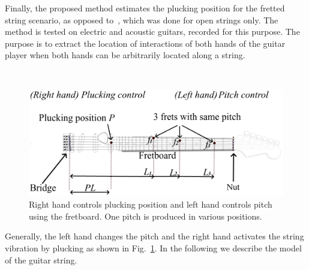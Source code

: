 \documentclass{article}
\begin{document}
Finally, the proposed method estimates the plucking position for the fretted string scenario, as opposed to~\cite{traube:pluckin_point_dafx,DBLP:conf/icassp/MohamadDH17}, which was done for open strings only. The method is tested on electric and acoustic guitars, recorded for this purpose. %
The purpose is to extract the location of interactions of both hands of the guitar player when both hands can be arbitrarily located along a string.
\begin{figure}[h!]\
  \centering
  \centerline{\includegraphics[width=.99\columnwidth]{img/fender_drawing7.png}}\vspace{-2mm}
  \caption{Right hand controls plucking position and left hand controls pitch using the fretboard. One pitch is produced in various positions.
  }\label{fig:guitar_overview}\vspace{-2mm}
\end{figure}
Generally, the left hand changes the pitch and the right hand activates the string vibration by plucking as shown in Fig.~\ref{fig:guitar_overview}. In the following we describe the model of the guitar string. 
%
%
%
%
\vspace{-1.9mm}
\end{document}
